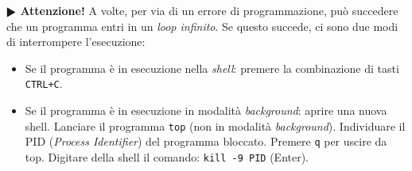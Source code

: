 \documentclass[11pt]{article}
\begin{document}
\begin{mdframed}[backgroundcolor=panna]
\textbf{$\RHD$ Attenzione!}
A volte, per via di un errore di programmazione, può succedere che un programma entri in un {\em loop infinito}.
Se questo succede, ci sono due modi di interrompere l'esecuzione:
\begin{itemize}
\item Se il programma è in esecuzione nella {\em shell\/}: premere la combinazione di tasti \texttt{CTRL+C}.
\item Se il programma è in esecuzione in modalit\`a {\em background\/}:
aprire una nuova shell. Lanciare il programma \texttt{top} (non in modalit\`a
 {\em background\/}). Individuare il PID ({\em Process Identifier\/}) del programma bloccato. Premere \texttt{q} per uscire da top.
Digitare della shell il comando: \texttt{kill -9 PID} (Enter).
\end{itemize}
\end{mdframed}

 
\end{document}

